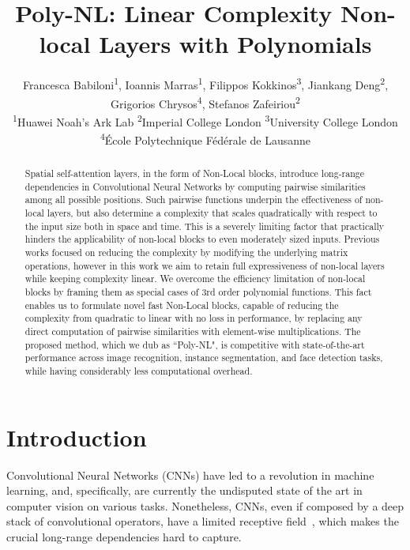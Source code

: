 \documentclass[10pt,twocolumn,letterpaper]{article}
\begin{document}
\title{Poly-NL: Linear Complexity Non-local Layers with Polynomials}
\author{
Francesca Babiloni\textsuperscript{1}, Ioannis Marras\textsuperscript{1}, Filippos Kokkinos\textsuperscript{3}, Jiankang Deng\textsuperscript{2}, Grigorios Chrysos\textsuperscript{4}, Stefanos Zafeiriou\textsuperscript{2} \\
\textsuperscript{1}Huawei Noah's Ark Lab \quad \textsuperscript{2}Imperial College London \quad \textsuperscript{3}University College London  \quad \\
\textsuperscript{4}École Polytechnique Fédérale de Lausanne  \quad }
\maketitle
\begin{abstract}
Spatial self-attention layers, in the form of Non-Local blocks, introduce long-range dependencies in Convolutional Neural Networks by computing pairwise similarities among all possible positions. Such pairwise functions underpin the effectiveness of non-local layers, but also determine a complexity that scales quadratically with respect to the input size both in space and time. This is a severely limiting factor that practically hinders the applicability of non-local blocks to even moderately sized inputs. Previous works focused on reducing the complexity by modifying the underlying matrix operations, however in this work we aim to retain full expressiveness of non-local layers while keeping complexity linear. We overcome the efficiency limitation of non-local blocks by framing them as special cases of 3rd order polynomial functions. 
This fact enables us to formulate novel fast Non-Local blocks, capable of reducing the complexity from quadratic to linear with no loss in performance, by replacing any direct computation of pairwise similarities with element-wise multiplications. The proposed method, which we dub as ``Poly-NL", is competitive with state-of-the-art performance across image recognition, instance segmentation, and face detection tasks, while having considerably less computational overhead.
\end{abstract}

\section{Introduction\vspace{-0.1cm}}
Convolutional Neural Networks (CNNs) have led to a revolution in machine learning, and, specifically, are currently the undisputed state of the art in computer vision on various tasks. Nonetheless, CNNs, even if composed by a deep stack of convolutional operators, have a limited receptive field~\cite{luo2017understanding}, which makes the crucial long-range dependencies hard to capture.
\end{document}
